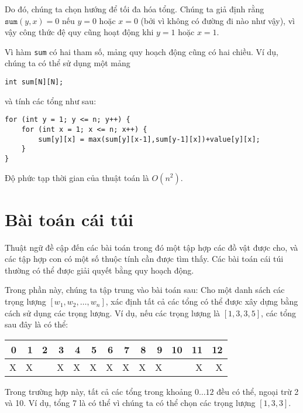 Do đó, chúng ta chọn hướng để tối đa hóa
tổng.
Chúng ta giả định rằng $\texttt{sum}(y,x)=0$
nếu $y=0$ hoặc $x=0$ (bởi vì không có đường đi nào như vậy),
vì vậy công thức đệ quy cũng hoạt động khi $y=1$ hoặc $x=1$.

Vì hàm \texttt{sum} có hai tham số,
mảng quy hoạch động cũng có hai chiều.
Ví dụ, chúng ta có thể sử dụng một mảng
\begin{lstlisting}
int sum[N][N];
\end{lstlisting}
và tính các tổng như sau:
\begin{lstlisting}
for (int y = 1; y <= n; y++) {
    for (int x = 1; x <= n; x++) {
        sum[y][x] = max(sum[y][x-1],sum[y-1][x])+value[y][x];
    }
}
\end{lstlisting}
Độ phức tạp thời gian của thuật toán là $O(n^2)$.

\section{Bài toán cái túi}


Thuật ngữ  đề cập đến các bài toán trong đó
một tập hợp các đồ vật được cho, và
các tập hợp con có một số thuộc tính
cần được tìm thấy.
Các bài toán cái túi thường có thể được giải quyết
bằng quy hoạch động.

Trong phần này, chúng ta tập trung vào
bài toán sau: Cho một danh sách các trọng lượng
$[w_1,w_2,\ldots,w_n]$,
xác định tất cả các
tổng có thể được xây dựng bằng cách sử dụng các trọng lượng.
Ví dụ, nếu các trọng lượng là
$[1,3,3,5]$, các tổng sau đây là có thể:

\begin{center}
\begin{tabular}{rrrrrrrrrrrrr}
 0 & 1 & 2 & 3 & 4 & 5 & 6 & 7 & 8 & 9 & 10 & 11 & 12 \\
\hline
 X & X & & X & X & X & X & X & X & X & & X & X \\
\end{tabular}
\end{center}

Trong trường hợp này, tất cả các tổng trong khoảng $0 \ldots 12$
đều có thể, ngoại trừ 2 và 10.
Ví dụ, tổng 7 là có thể vì chúng ta
có thể chọn các trọng lượng $[1,3,3]$.


